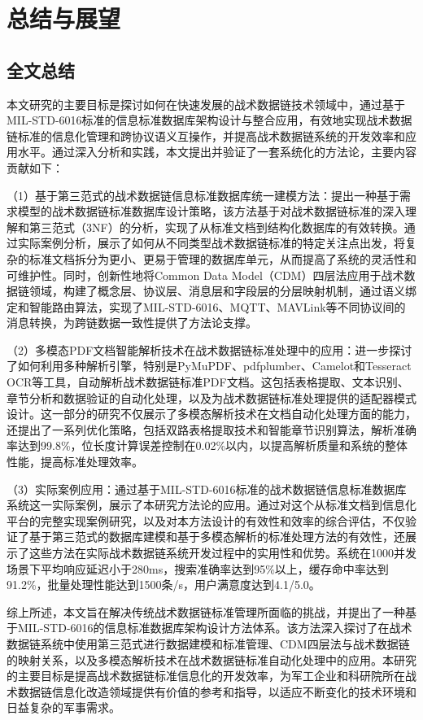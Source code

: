 \chapter{总结与展望}

\section{全文总结}

本文研究的主要目标是探讨如何在快速发展的战术数据链技术领域中，通过基于MIL-STD-6016标准的信息标准数据库架构设计与整合应用，有效地实现战术数据链标准的信息化管理和跨协议语义互操作，并提高战术数据链系统的开发效率和应用水平。通过深入分析和实践，本文提出并验证了一套系统化的方法论，主要内容贡献如下：

（1）基于第三范式的战术数据链信息标准数据库统一建模方法：提出一种基于需求模型的战术数据链标准数据库设计策略，该方法基于对战术数据链标准的深入理解和第三范式（3NF）的分析，实现了从标准文档到结构化数据库的有效转换。通过实际案例分析，展示了如何从不同类型战术数据链标准的特定关注点出发，将复杂的标准文档拆分为更小、更易于管理的数据库单元，从而提高了系统的灵活性和可维护性。同时，创新性地将Common Data Model（CDM）四层法应用于战术数据链领域，构建了概念层、协议层、消息层和字段层的分层映射机制，通过语义绑定和智能路由算法，实现了MIL-STD-6016、MQTT、MAVLink等不同协议间的消息转换，为跨链数据一致性提供了方法论支撑。

（2）多模态PDF文档智能解析技术在战术数据链标准处理中的应用：进一步探讨了如何利用多种解析引擎，特别是PyMuPDF、pdfplumber、Camelot和Tesseract OCR等工具，自动解析战术数据链标准PDF文档。这包括表格提取、文本识别、章节分析和数据验证的自动化处理，以及为战术数据链标准处理提供的适配器模式设计。这一部分的研究不仅展示了多模态解析技术在文档自动化处理方面的能力，还提出了一系列优化策略，包括双路表格提取技术和智能章节识别算法，解析准确率达到99.8\%，位长度计算误差控制在0.02\%以内，以提高解析质量和系统的整体性能，提高标准处理效率。

（3）实际案例应用：通过基于MIL-STD-6016标准的战术数据链信息标准数据库系统这一实际案例，展示了本研究方法论的应用。通过对这个从标准文档到信息化平台的完整实现案例研究，以及对本方法设计的有效性和效率的综合评估，不仅验证了基于第三范式的数据库建模和基于多模态解析的标准处理方法的有效性，还展示了这些方法在实际战术数据链系统开发过程中的实用性和优势。系统在1000并发场景下平均响应延迟小于280ms，搜索准确率达到95\%以上，缓存命中率达到91.2\%，批量处理性能达到1500条/s，用户满意度达到4.1/5.0。

综上所述，本文旨在解决传统战术数据链标准管理所面临的挑战，并提出了一种基于MIL-STD-6016的信息标准数据库架构设计方法体系。该方法深入探讨了在战术数据链系统中使用第三范式进行数据建模和标准管理、CDM四层法与战术数据链的映射关系，以及多模态解析技术在战术数据链标准自动化处理中的应用。本研究的主要目标是提高战术数据链标准信息化的开发效率，为军工企业和科研院所在战术数据链信息化改造领域提供有价值的参考和指导，以适应不断变化的技术环境和日益复杂的军事需求。

